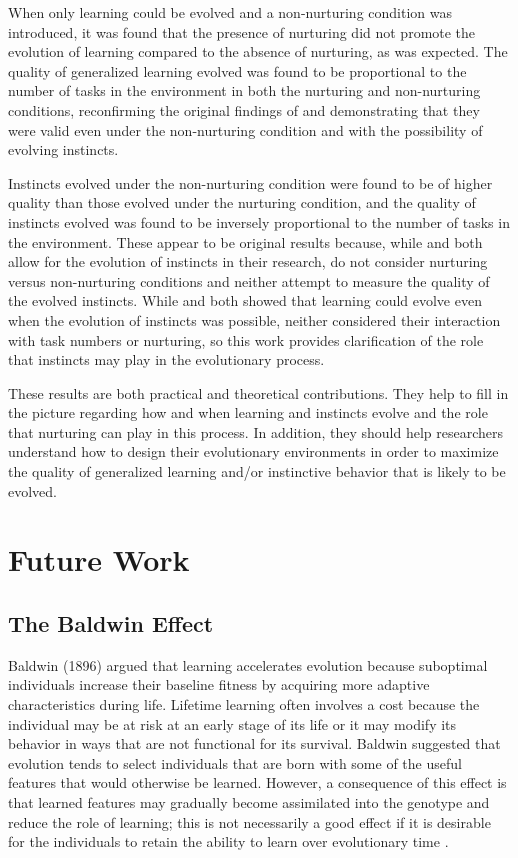 \documentclass[master]{outhesis}
\begin{document}
When only learning could be evolved and a non-nurturing condition was introduced,
it was found that the presence of nurturing did not promote the evolution of learning compared to the absence of nurturing,
as was expected.
The quality of generalized learning evolved was found to be proportional to the number of tasks in the environment in both the nurturing and non-nurturing conditions,
reconfirming the original findings of \citet{Chalmers:1990aa} and demonstrating that they were valid even under the non-nurturing condition and with the possibility of evolving instincts.

Instincts evolved under the non-nurturing condition were found to be of higher quality than those evolved under the nurturing condition,
and the quality of instincts evolved was found to be inversely proportional to the number of tasks in the environment.
These appear to be original results because,
while \citet{Niv:2002aa} and \citet{Shah:2015hs} both allow for the evolution of instincts in their research,
\citeauthor{Niv:2002aa} do not consider nurturing versus non-nurturing conditions
and neither attempt to measure the quality of the evolved instincts.
While \citeauthor{Niv:2002aa} and \citeauthor{Shah:2015hs} both showed that learning could evolve even when the evolution of instincts was possible,
neither considered their interaction with task numbers or nurturing,
so this work provides clarification of the role that instincts may play in the evolutionary process.

These results are both practical and theoretical contributions.
They help to fill in the picture regarding how and when learning and instincts evolve and the role that nurturing can play in this process.
In addition, they should help researchers understand how to design their evolutionary environments in order to maximize the quality of generalized learning and/or instinctive behavior that is likely to be evolved.

\chapter{Future Work}

\section{The Baldwin Effect}

Baldwin (1896) argued that learning accelerates evolution because suboptimal individuals increase their baseline fitness by acquiring more adaptive characteristics during life. 
Lifetime learning often involves a cost because the individual may be at risk at an early stage of its life or it may modify its behavior in ways that are not functional for its survival.
Baldwin suggested that evolution tends to select individuals that are born with some of the useful features that would otherwise be learned.
However, a consequence of this effect is that learned features may gradually become assimilated into the genotype and reduce the role of learning;
this is not necessarily a good effect if it is desirable for the individuals to retain the ability to learn over evolutionary time \citep{Floreano:2008wv}.
\end{document}

